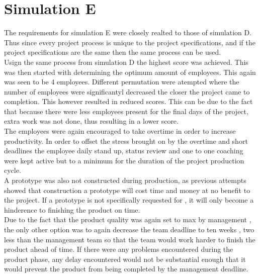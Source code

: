 \documentclass{article}
\begin{document}
\pagebreak


\section{Simulation E}


The requirements for simulation E were closely realted to those of simulation D. Thus since every project process is unique to the project specifications, and if the project specifications are the same then the same process can be used.\\
Usign the same process from simulation D the highest score was achieved. This was then started with determining the optimum amount of employees. This again was seen to be 4 employees. Different permutation were atempted where the number of employees were significantyl decreased the closer the project came to completion. This however resulted in reduced scores. This can be due to the fact that because there were less employees present for the final days of the project, extra work was not done, thus resulting in a lower score.\\
The employees were again encouraged to take overtime in order to increase productivity. In order to offset the stress brought on by the overtime and short deadlines the employee daily stand up, status review and one to one coaching were kept active but to a minimum for the duration of the project production cycle. \\
A prototype was also not constructed during production, as previous attempts showed that construction a prototype will cost time and money at no benefit to the project. If a prototype is not specifically requested for , it will only become a hinderence to finishing the product on time.\\
Due to the fact that the product quality was again set to max by management , the only other option was to again decrease the team deadline to ten weeks ,  two less than the management team so that the team would work harder to finish the product ahead of time. If there were any problems encountered during the product phase, any delay encountered would not be substantial enough that it would prevent the product from being completed by the management deadline.\\
\end{document}
